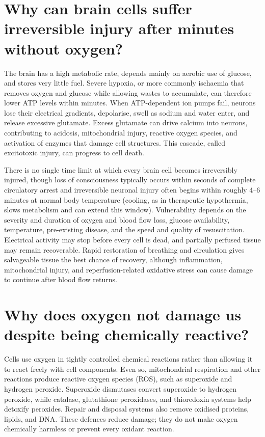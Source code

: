 \documentclass[11pt,oneside]{report}
\begin{document}
\section{Why can brain cells suffer irreversible injury after minutes without oxygen?}

The brain has a high metabolic rate, depends mainly on aerobic use of glucose,
and stores very little fuel. Severe hypoxia, or more commonly ischaemia that
removes oxygen and glucose while allowing wastes to accumulate, can therefore
lower ATP levels within minutes. When ATP-dependent ion pumps fail, neurons
lose their electrical gradients, depolarise, swell as sodium and water enter,
and release excessive glutamate. Excess glutamate can drive calcium into
neurons, contributing to acidosis, mitochondrial injury, reactive oxygen
species, and activation of enzymes that damage cell structures. This cascade,
called excitotoxic injury, can progress to cell death.

There is no single time limit at which every brain cell becomes irreversibly
injured, though loss of consciousness typically occurs within seconds of
complete circulatory arrest and irreversible neuronal injury often begins within
roughly 4--6 minutes at normal body temperature (cooling, as in therapeutic
hypothermia, slows metabolism and can extend this window). Vulnerability depends
on the severity and duration of oxygen and blood flow loss, glucose
availability, temperature, pre-existing disease, and the speed and quality of
resuscitation. Electrical activity may stop before every
cell is dead, and partially perfused tissue may remain recoverable. Rapid
restoration of breathing and circulation gives salvageable tissue the best
chance of recovery, although inflammation, mitochondrial injury, and
reperfusion-related oxidative stress can cause damage to continue after blood
flow returns.

\section{Why does oxygen not damage us despite being chemically reactive?}

Cells use oxygen in tightly controlled chemical reactions rather than allowing
it to react freely with cell components. Even so, mitochondrial respiration and
other reactions produce reactive oxygen species (ROS), such as superoxide and
hydrogen peroxide. Superoxide dismutases convert superoxide to hydrogen
peroxide, while catalase, glutathione peroxidases, and thioredoxin systems help
detoxify peroxides. Repair and disposal systems also remove oxidised proteins,
lipids, and DNA. These defences reduce damage; they do not make oxygen
chemically harmless or prevent every oxidant reaction.
\end{document}
